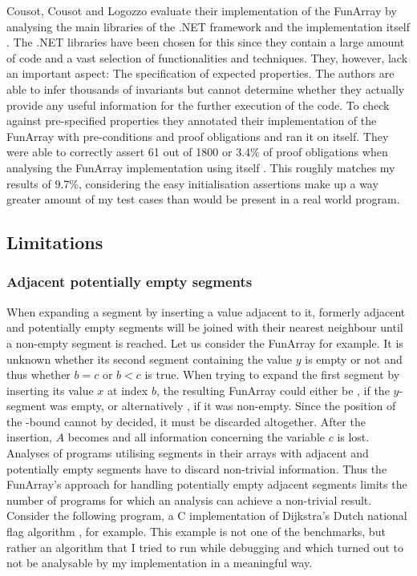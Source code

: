 Cousot, Cousot and Logozzo evaluate their implementation of the FunArray by analysing the main libraries of the .NET framework and the implementation itself \cite{cousot2011}. The .NET libraries have been chosen for this since they contain a large amount of code and a vast selection of functionalities and techniques. They, however, lack an important aspect: The specification of expected properties. The authors are able to infer thousands of invariants but cannot determine whether they actually provide any useful information for the further execution of the code. To check against pre-specified properties they annotated their implementation of the FunArray with pre-conditions and proof obligations and ran it on itself. They were able to correctly assert 61 out of 1800 or 3.4\% of proof obligations when analysing the FunArray implementation using itself \cite{cousot2011}. This roughly matches my results of 9.7\%, considering the easy initialisation assertions make up a way greater amount of my test cases than would be present in a real world program.

\subsection{Limitations}

\subsubsection{Adjacent potentially empty segments}
When expanding a segment by inserting a value adjacent to it, formerly adjacent and potentially empty segments will be joined with their nearest neighbour until a non-empty segment is reached. Let us consider the FunArray  for example. It is unknown whether its second segment containing the value $y$ is empty or not and thus whether $b=c$ or $b<c$ is true.
When trying to expand the first segment by inserting its value $x$ at index $b$, the resulting FunArray could either be , if the $y$-segment was empty, or alternatively , if it was non-empty. Since the position of the -bound cannot by decided, it must be discarded altogether. After the insertion, $A$ becomes  and all information concerning the variable $c$ is lost.
Analyses of programs utilising segments in their arrays with adjacent and potentially empty segments have to discard non-trivial information. Thus the FunArray's approach for handling potentially empty adjacent segments limits the number of programs for which an analysis can achieve a non-trivial result. Consider the following program, a C implementation of Dijkstra's Dutch national flag algorithm \cite{dijkstra1976}, for example. This example is not one of the benchmarks, but rather an algorithm that I tried to run while debugging and which turned out to not be analysable by my implementation in a meaningful way.
 
